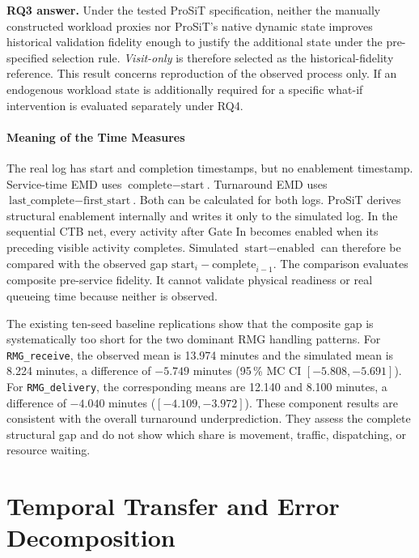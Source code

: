 \noindent\textbf{RQ3 answer.}
Under the tested ProSiT specification, neither the manually constructed
workload proxies nor ProSiT's native dynamic state improves historical
validation fidelity enough to justify the additional state under the
pre-specified selection rule. \textit{Visit-only} is therefore selected as the
historical-fidelity reference. This result concerns reproduction of the
observed process only. If an endogenous workload state is additionally required for a
specific what-if intervention is evaluated separately under RQ4.

\paragraph{Meaning of the Time Measures}
\label{sec:results_temporal_note}

The real log has start and completion timestamps, but no enablement timestamp.
Service-time EMD uses $\text{complete}-\text{start}$. Turnaround EMD uses
$\text{last\_complete}-\text{first\_start}$. Both can be calculated for both
logs. ProSiT derives structural enablement internally and writes it only to the
simulated log. In the sequential CTB net, every activity after Gate In becomes
enabled when its preceding visible activity completes. Simulated
$\text{start}-\text{enabled}$ can therefore be compared with the observed gap
$\text{start}_{i}-\text{complete}_{i-1}$. The comparison evaluates composite
pre-service fidelity. It cannot validate physical readiness or real queueing
time because neither is observed.

The existing ten-seed baseline replications show that the composite gap is
systematically too short for the two dominant RMG handling patterns. For
\texttt{RMG\_receive}, the observed mean is 13.974 minutes and the simulated
mean is 8.224 minutes, a difference of $-5.749$ minutes (95\,\% MC CI
$[-5.808,-5.691]$). For \texttt{RMG\_delivery}, the corresponding means are
12.140 and 8.100 minutes, a difference of $-4.040$ minutes
($[-4.109,-3.972]$). These component results are consistent with the overall
turnaround underprediction. They assess the complete structural gap and do not
show which share is movement, traffic, dispatching, or resource waiting.

\section{Temporal Transfer and Error Decomposition}
\label{sec:results_temporal_transfer}

